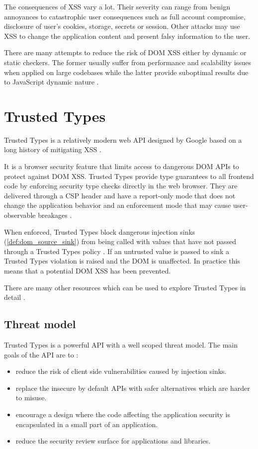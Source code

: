 The consequences of XSS vary a lot. Their severity can range from benign annoyances to catastrophic
user consequences such as full account compromise, disclosure of user's cookies, storage, secrets or
session. Other attacks may use XSS to change the application content and present falsy information
to the user.

There are many attempts to reduce the risk of DOM XSS either by dynamic or static checkers. The
former usually suffer from performance and scalability issues when applied on large codebases while
the latter provide suboptimal results due to JavaScript dynamic nature
\cite{tt_web_framework_paper} \cite{owasp_xss_cheatsheet}.

\section{Trusted Types}

Trusted Types is a relatively modern web API designed by Google based on a long history of
mitigating XSS \cite{tt_design_history}.

It is a browser security feature that limits access to dangerous DOM APIs to protect against DOM
XSS. Trusted Types provide type guarantees to all frontend code by enforcing security type checks
directly in the web browser. They are delivered through a CSP header and have a report-only mode
that does not change the application behavior and an enforcement mode that may cause user-observable
breakages \cite{tt_background}.

When enforced, Trusted Types block dangerous injection sinks (\ref{def:dom_source_sink}) from being
called with values that have not passed through a Trusted Types policy \cite{tt_background}. If an
untrusted value is passed to sink a Trusted Types violation is raised and the DOM is unaffected. In
practice this means that a potential DOM XSS has been prevented.

There are many other resources which can be used to explore Trusted Types in detail
\cite{tt_resources}.

\subsection{Threat model}

Trusted Types is a powerful API with a well scoped threat model. The main goals of the API are to
\cite{tt_spec:goals}:

\begin{itemize}
  \item reduce the risk of client side vulnerabilities caused by injection sinks.
  \item replace the insecure by default APIs with safer alternatives which are harder to misuse.
  \item encourage a design where the code affecting the application security is encapsulated in a
        small part of an application.
  \item reduce the security review surface for applications and libraries.
\end{itemize}

